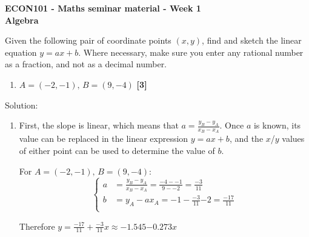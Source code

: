 \documentclass[a4paper, leqno, 12pt]{article}
\newenvironment{top_enumerate}{
\begin{enumerate}
  \setlength{\itemsep}{2em}
  \setlength{\topsep}{-0pt}
  \setlength{\partopsep}{-0pt}
}{\end{enumerate}}
\begin{document}
\singlespacing
\begin{center}
\textbf{
ECON101 - Maths seminar material - Week 1\\
\bigskip
Algebra
}
\end{center}
\bigskip

\begin{top_enumerate}

\item Given the following pair of coordinate points $(x,y)$, find and sketch the linear equation $y = ax + b$. Where necessary, make sure you enter any rational number as a fraction, and not as a decimal number.
 
\setcounter{equation}{0}  %
\begin{enumerate}
	\setlength{\topsep}{-0pt}
	\setlength{\partopsep}{-0pt}
	\setlength{\itemsep}{10pt}
			\item $A= ({-2},{-1}),\, B= ({9},{-4})$
	 \quad \textbf{[3]}
\end{enumerate}\addtocounter{enumi}{-1}
\item Solution:
 
\setcounter{equation}{0}  %
\begin{enumerate}
	\setlength{\topsep}{-0pt}
	\setlength{\partopsep}{-0pt}
	\setlength{\itemsep}{10pt}
			\item First, the slope is linear, which means that $a = \frac{y_B-y_A}{x_B-x_A}$. Once $a$ is known, its value can be replaced in the linear expression $y = ax + b$, and the $x$/$y$ values of either point can be used to determine the value of $b$.
	
	For $A= ({-2},{-1}),\, B= ({9},{-4})$:
	\[
	\left\{\begin{aligned}
	a & = \frac{y_B-y_A}{x_B-x_A} = \frac{{-4}-{-1}}{{9}-{-2}} = \frac{{-3}}{{11}}\\
	b & = y_A -ax_A = {-1} - \frac{{-3}}{{11}}{-2} = \frac{{-17}}{{11}} \\
	 \end{aligned}\right.
	\]
	
	Therefore $y = \frac{{-17}}{{11}} + \frac{{-3}}{{11}}x \approx {-1.545} { } {-0.273}x$
	

\end{enumerate}
\end{top_enumerate}
\end{document}
